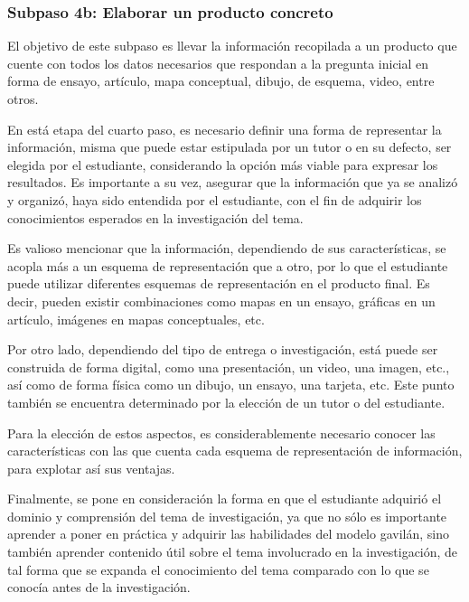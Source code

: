 
\subsubsection{Subpaso 4b: Elaborar un producto concreto}
\label{secPaso4bCap2}

El objetivo de este subpaso es llevar la información recopilada a un producto que cuente con todos los datos necesarios que respondan a la pregunta inicial en forma de ensayo, artículo, mapa conceptual, dibujo, de esquema, video, entre otros.

En está etapa del cuarto paso, es necesario definir una forma de representar la información, misma que puede estar estipulada por un tutor o en su defecto, ser elegida por el estudiante, considerando la opción más viable para expresar los resultados. Es importante a su vez, asegurar que la información que ya se analizó y organizó, haya sido entendida por el estudiante, con el fin de adquirir los conocimientos esperados en la investigación del tema.

Es valioso mencionar que la información, dependiendo de sus características, se acopla más a un esquema de representación que a otro, por lo que el estudiante puede utilizar diferentes esquemas de representación en el producto final. Es decir, pueden existir combinaciones como mapas en un ensayo, gráficas en un artículo, imágenes en mapas conceptuales, etc.

Por otro lado, dependiendo del tipo de entrega o investigación, está puede ser construida de forma digital, como una presentación, un video, una imagen, etc., así como de forma física como un dibujo, un ensayo, una tarjeta, etc. Este punto también se encuentra determinado por la elección de un tutor o del estudiante.

Para la elección de estos aspectos, es considerablemente necesario conocer las características con las que cuenta cada esquema de representación de información, para explotar así sus ventajas.

Finalmente, se pone en consideración la forma en que el estudiante adquirió el dominio y comprensión del tema de investigación, ya que no sólo es importante aprender a poner en práctica y adquirir las habilidades del modelo gavilán, sino también aprender contenido útil sobre el tema involucrado en la investigación, de tal forma que se expanda el conocimiento del tema comparado con lo que se conocía antes de la investigación.

